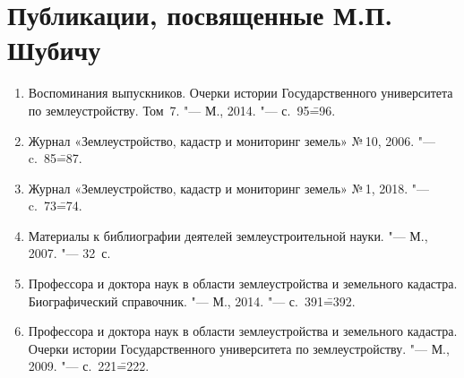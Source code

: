 \section{Публикации, посвященные М.П. Шубичу}
\begin{enumerate}
	\item Воспоминания выпускников. Очерки истории Государственного университета по землеустройству. Том~7. "--- М., 2014. "--- с.~95\==96.
	\item Журнал «Землеустройство, кадастр и мониторинг земель» №\,10, 2006. "--- c.~85\==87.
	\item Журнал «Землеустройство, кадастр и мониторинг земель» №\,1, 2018. "--- c.~73\==74.
	\item Материалы к библиографии деятелей землеустроительной науки. "--- М., 2007. "--- 32~с.
	\item Профессора и доктора наук в области землеустройства и земельного кадастра. Биографический справочник. "--- М., 2014. "--- с.~391\==392.
	\item Профессора и доктора наук в области землеустройства и земельного кадастра. Очерки истории Государственного университета по землеустройству. "--- М., 2009. "--- с.~221\==222.
\end{enumerate}